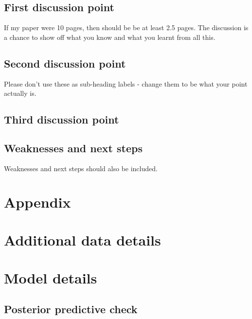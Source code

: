 \documentclass[
  letterpaper,
  DIV=11,
  numbers=noendperiod]{scrartcl}
\begin{document}
\subsection{First discussion point}\label{sec-first-point}

If my paper were 10 pages, then should be be at least 2.5 pages. The
discussion is a chance to show off what you know and what you learnt
from all this.

\subsection{Second discussion point}\label{second-discussion-point}

Please don't use these as sub-heading labels - change them to be what
your point actually is.

\subsection{Third discussion point}\label{third-discussion-point}

\subsection{Weaknesses and next steps}\label{weaknesses-and-next-steps}

Weaknesses and next steps should also be included.

\newpage

\appendix

\section*{Appendix}\label{appendix}

\section{Additional data details}\label{additional-data-details}

\section{Model details}\label{sec-model-details}

\subsection{Posterior predictive
check}\label{posterior-predictive-check}
\end{document}
